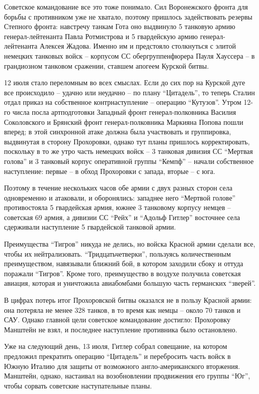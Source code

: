 Советское командование все это тоже понимало. Сил Воронежского фронта для
борьбы с противником уже не хватало, поэтому пришлось задействовать резервы
Степного фронта: навстречу танкам Гота оно выдвинуло 5 танковую армию
генерал-лейтенанта Павла Ротмистрова и 5 гвардейскую армию генерал-лейтенанта
Алексея Жадова. Именно им и предстояло столкнуться с элитой немецких танковых
войск – корпусом СС обергруппенфюрера Пауля Хауссера – в грандиозном танковом
сражении, ставшем апогеем Курской битвы.

12 июля стало переломным во всех смыслах. Если до сих пор на Курской дуге все
происходило – удачно или неудачно – по плану \enquote{Цитадель}, то теперь Сталин отдал
приказ на собственное контрнаступление – операцию \enquote{Кутузов}. Утром 12-го числа
посла артподготовки Западный фронт генерал-полковника Василия Соколовского и
Брянский фронт генерал-полковника Маркияна Попова пошли вперед; в этой
синхронной атаке должна была участвовать и группировка, выдвинутая в сторону
Прохоровки, однако тут планы пришлось корректировать, поскольку в то же утро
часть немецких войск – 3 танковая дивизия СС \enquote{Мертвая голова} и 3 танковый
корпус оперативной группы \enquote{Кемпф} – начали собственное наступление: первые – в
обход Прохоровки с запада, вторые – с юга.

Поэтому в течение нескольких часов обе армии с двух разных сторон села
одновременно и атаковали, и оборонялись: западнее него \enquote{Мертвой голове}
противостояла 5 гвардейская армия, южнее 3 танковому корпусу немцев – советская
69 армия, а дивизии СС \enquote{Рейх} и \enquote{Адольф Гитлер} восточнее села сдерживали
наступление 5 гвардейской танковой армии.

Преимущества \enquote{Тигров} никуда не делись, но войска Красной армии сделали все,
чтобы их нейтрализовать. \enquote{Тридцатьчетверки}, пользуясь количественным
преимуществом, навязывали ближний бой, в котором заходили сбоку и оттуда
поражали \enquote{Тигров}. Кроме того, преимущество в воздухе получила советская
авиация, которая и уничтожила авиабомбами большую часть германских \enquote{зверей}.

В цифрах потерь итог Прохоровской битвы оказался не в пользу Красной армии: она
потеряла не менее 328 танков, в то время как немцы – около 70 танков и САУ.
Однако главной цели советское командование достигло: Прохоровку Манштейн не
взял, и последнее наступление противника было остановлено.

Уже на следующий день, 13 июля, Гитлер собрал совещание, на котором предложил
прекратить операцию \enquote{Цитадель} и перебросить часть войск в Южную Италию для
защиты от возможного англо-американского вторжения. Манштейн, однако, настаивал
на возобновлении продвижения его группы \enquote{Юг}, чтобы сорвать советские
наступательные планы.

